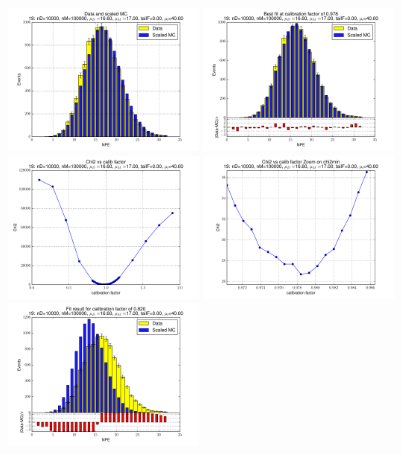 
 \begin{figure}[htbp] \begin{center} 
\includegraphics[width=0.45\textwidth]{../FIGURES/19/FIG_Data_and_scaled_MC.pdf} 
\includegraphics[width=0.45\textwidth]{../FIGURES/19/FIG_Best_fit_at_calibration_factor_of_0_978.pdf} 
\includegraphics[width=0.45\textwidth]{../FIGURES/19/FIG_Chi2_vs_calib_factor.pdf} 
\includegraphics[width=0.45\textwidth]{../FIGURES/19/FIG_Chi2_vs_calib_factor_Zoom_on_chi2min.pdf} 
\includegraphics[width=0.45\textwidth]{../FIGURES/19/FIG_Fit_result_for_calibration_factor_of_0_820.pdf} 

\end{center}
\end{figure}
